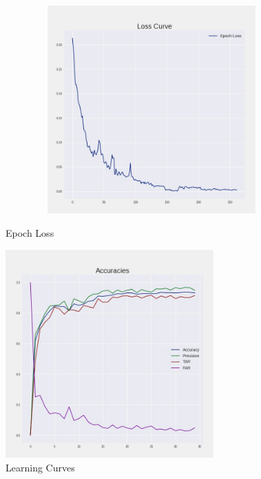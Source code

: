 \documentclass[
12pt,
tightenlines,
aps,
prb,
twocolumn,
superscriptaddress,
longbibliography,
floatfix
]{revtex4-2}
\begin{document}
\begin{figure}[h!]
    \begin{minipage}[b]{0.45\linewidth}
    \centering
    \includegraphics[clip=true,width=1.1\textwidth, height=8cm]{LFWfinal_epochloss.jpeg}
    \caption{Epoch Loss}
     \label{fig:epoch_loss}
     \end{minipage}
     \hspace{1cm}
    \begin{minipage}[b]{0.45\linewidth}
    \centering
    \includegraphics[clip=true,width=\textwidth, height=8cm]{LFWfinal_acc.jpeg}
    \caption{Learning Curves}
    \label{fig:acc}
    \end{minipage}
\end{figure}
\end{document}
